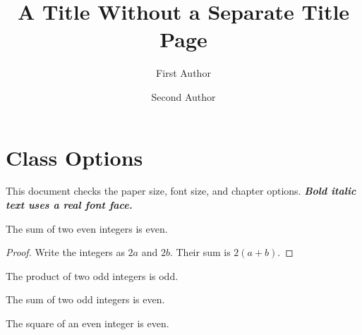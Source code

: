 \documentclass[12pt,letterpaper,oneside,openany,notitlepage]{unbloated-book}
\title{A Title Without a Separate Title Page}
\author{First Author \and Second Author}
\date{}
\begin{document}
\maketitle
\chapter{Class Options}
This document checks the paper size, font size, and chapter options.
\textbf{\textit{Bold italic text uses a real font face.}}
\begin{theorem}
The sum of two even integers is even.
\end{theorem}
\begin{proof}
Write the integers as \(2a\) and \(2b\). Their sum is \(2(a+b)\).
\end{proof}
\begin{lemma}
The product of two odd integers is odd.
\end{lemma}
\begin{proposition}
The sum of two odd integers is even.
\end{proposition}
\begin{corollary}
The square of an even integer is even.
\end{corollary}
\end{document}

